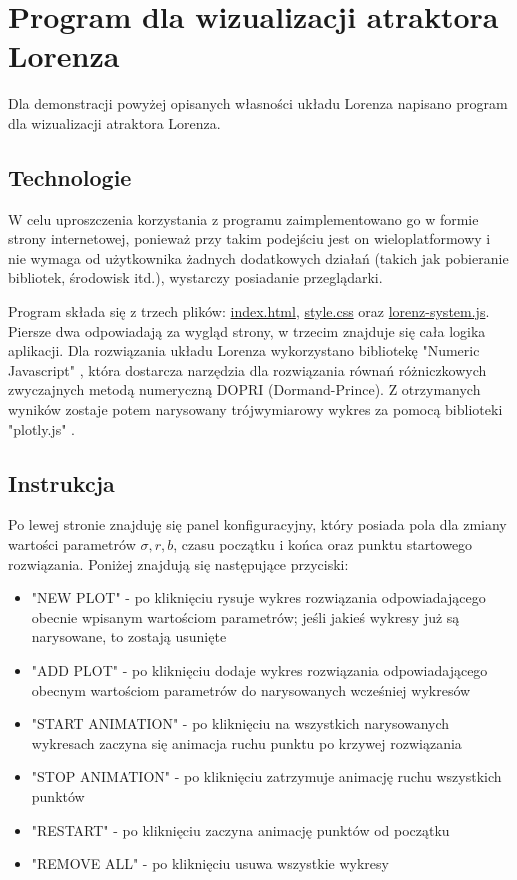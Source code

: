 \documentclass[12pt]{report}
\begin{document}
\chapter{Program dla wizualizacji atraktora Lorenza}
	\par Dla demonstracji powyżej opisanych własności układu Lorenza napisano program dla wizualizacji atraktora Lorenza.
	
	\section{Technologie}
	\par W celu uproszczenia korzystania z programu zaimplementowano go w formie strony internetowej, ponieważ przy takim podejściu  jest on wieloplatformowy i nie wymaga od użytkownika żadnych dodatkowych działań (takich jak pobieranie bibliotek, środowisk itd.), wystarczy posiadanie przeglądarki.
	
	\par Program składa się z trzech plików: \hyperref[sec:html]{index.html}, \hyperref[sec:css]{style.css} oraz \hyperref[sec:js]{lorenz-system.js}. Piersze dwa odpowiadają za wygląd strony, w trzecim znajduje się cała logika aplikacji. Dla rozwiązania układu Lorenza wykorzystano bibliotekę "Numeric Javascript" \cite{NumJS}, która dostarcza narzędzia dla rozwiązania równań różniczkowych zwyczajnych metodą numeryczną DOPRI (Dormand-Prince). Z otrzymanych wyników zostaje potem narysowany trójwymiarowy wykres za pomocą biblioteki "plotly.js" \cite{Plotly}.
	
	\section{Instrukcja}
	\par Po lewej stronie znajduję się panel konfiguracyjny, który posiada pola dla zmiany wartości parametrów $\sigma, r, b$, czasu początku i końca oraz punktu startowego rozwiązania. Poniżej znajdują się następujące przyciski:
	\begin{itemize}
		\item "NEW PLOT" - po kliknięciu rysuje wykres rozwiązania odpowiadającego obecnie wpisanym wartościom parametrów; jeśli jakieś wykresy już są narysowane, to zostają usunięte
		\item "ADD PLOT" - po kliknięciu dodaje wykres rozwiązania odpowiadającego obecnym wartościom parametrów do narysowanych wcześniej wykresów
		\item "START ANIMATION" - po kliknięciu na wszystkich narysowanych wykresach zaczyna się animacja ruchu punktu po krzywej rozwiązania
		\item "STOP ANIMATION" - po kliknięciu zatrzymuje animację ruchu wszystkich punktów
		\item "RESTART" - po kliknięciu zaczyna animację punktów od początku 
		\item "REMOVE ALL" - po kliknięciu usuwa wszystkie wykresy
	\end{itemize}
\end{document}
